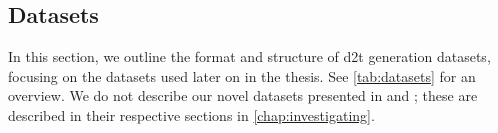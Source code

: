 {%


\subsection{Datasets}
\label{sec:datasets}

In this section, we outline the format and structure of \ac{d2t} generation datasets, focusing on the datasets used later on in the thesis. See \autoref{tab:datasets} for an overview. We do not describe our novel datasets presented in \citet{kasnerMindLabelsDescribing2022} and \citet{kasnerReferenceBasedMetricsAnalyzing2024}; these are described in their respective sections in \autoref{chap:investigating}.

}
